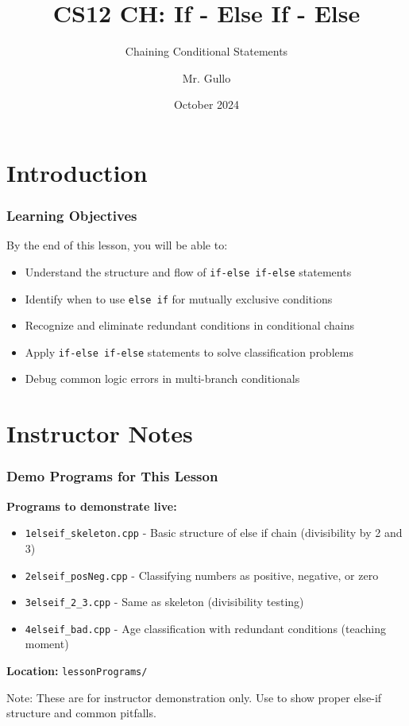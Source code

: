 \documentclass{beamer}
\title[If Else-If Else]{CS12 CH: If - Else If - Else}
\subtitle{Chaining Conditional Statements}
\author[Mr. Gullo]{Mr. Gullo}
\date[Oct 2024]{October 2024}
\begin{document}
\frame{\titlepage}

\section{Introduction}

\begin{frame}
\frametitle{Learning Objectives}
By the end of this lesson, you will be able to:
\begin{itemize}
    \item Understand the structure and flow of \texttt{if-else if-else} statements\pause
    \item Identify when to use \texttt{else if} for mutually exclusive conditions\pause
    \item Recognize and eliminate redundant conditions in conditional chains\pause
    \item Apply \texttt{if-else if-else} statements to solve classification problems\pause
    \item Debug common logic errors in multi-branch conditionals
\end{itemize}
\end{frame}

\section{Instructor Notes}

\begin{frame}
\frametitle{Demo Programs for This Lesson}
\textbf{Programs to demonstrate live:}
\begin{itemize}
    \item \texttt{1elseif\_skeleton.cpp} - Basic structure of else if chain (divisibility by 2 and 3)
    \item \texttt{2elseif\_posNeg.cpp} - Classifying numbers as positive, negative, or zero
    \item \texttt{3elseif\_2\_3.cpp} - Same as skeleton (divisibility testing)
    \item \texttt{4elseif\_bad.cpp} - Age classification with redundant conditions (teaching moment)
\end{itemize}

\vspace{0.3cm}
\textbf{Location:} \texttt{lessonPrograms/}

\vspace{0.3cm}
\alert{Note:} These are for instructor demonstration only. Use to show proper else-if structure and common pitfalls.
\end{frame}
\end{document}
